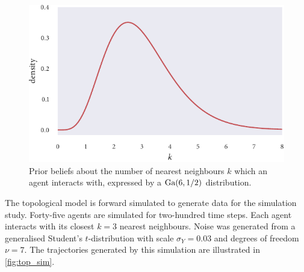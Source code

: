 \begin{figure}[tbp]
  \includegraphics{top_priors.pdf}
  \caption{Prior beliefs about the number of nearest neighbours $k$ which an agent
    interacts with, expressed by a $\textrm{Ga}(6, 1/2)$ distribution.}
  \label{fig:top_priors}
\end{figure}

The topological model is forward simulated to generate data for the simulation study.
Forty-five agents are simulated for two-hundred time steps. Each agent interacts with its
closest $k=3$ nearest neighbours. Noise was generated from a generalised Student's
$t$-distribution with scale $\sigma_Y=0.03$ and degrees of freedom $\nu=7$. The
trajectories generated by this simulation are illustrated in \cref{fig:top_sim}.

